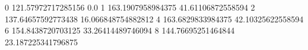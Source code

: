 0 121.57972717285156 0.0
1 163.1907958984375 41.61106872558594
2 137.64657592773438 16.066848754882812
4 163.6829833984375 42.10325622558594
6 154.8438720703125 33.26414489746094
8 144.76695251464844 23.187225341796875
